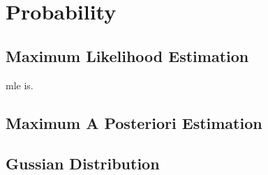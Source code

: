 \chapter{Probability}\label{chp:Probability}
\minitoc

\section{Maximum Likelihood Estimation}

\gls{mle} is.

\section{Maximum A Posteriori Estimation}

\section{Gussian Distribution}
